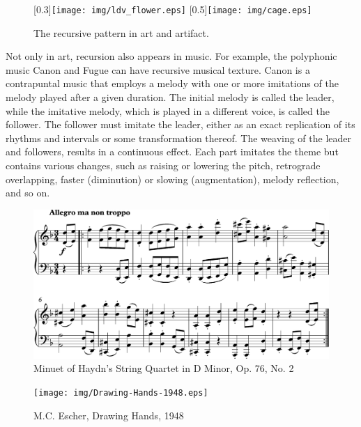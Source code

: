 \documentclass{article}
\begin{document}
\begin{figure}[htbp]
 \centering
 [0.3\linewidth]{\texttt{[image: img/ldv\_flower.eps]}} \quad
 [0.5\linewidth]{\texttt{[image: img/cage.eps]}}
 \caption{The recursive pattern in art and artifact.}
 \label{fig:flower}
\end{figure}

Not only in art, recursion also appears in music. For example, the polyphonic music Canon and Fugue can have recursive musical texture. Canon is a contrapuntal music that employs a melody with one or more imitations of the melody played after a given duration. The initial melody is called the leader, while the imitative melody, which is played in a different voice, is called the follower. The follower must imitate the leader, either as an exact replication of its rhythms and intervals or some transformation thereof. The weaving of the leader and followers, results in a continuous effect. Each part imitates the theme but contains various changes, such as raising or lowering the pitch, retrograde overlapping, faster (diminution) or slowing (augmentation), melody reflection, and so on.

\begin{figure}[htbp]
 \centering
 \includegraphics[scale=0.8]{img/Haydn-OP-76.png}
 \caption{Minuet of Haydn's String Quartet in D Minor, Op. 76, No. 2}
 \label{fig:Drawing-Hands}
\end{figure}

\begin{figure}
 \centering
 \texttt{[image: img/Drawing-Hands-1948.eps]}
 \caption{M.C. Escher, Drawing Hands, 1948}
 \label{fig:Drawing-Hands}
\end{figure}
\end{document}
